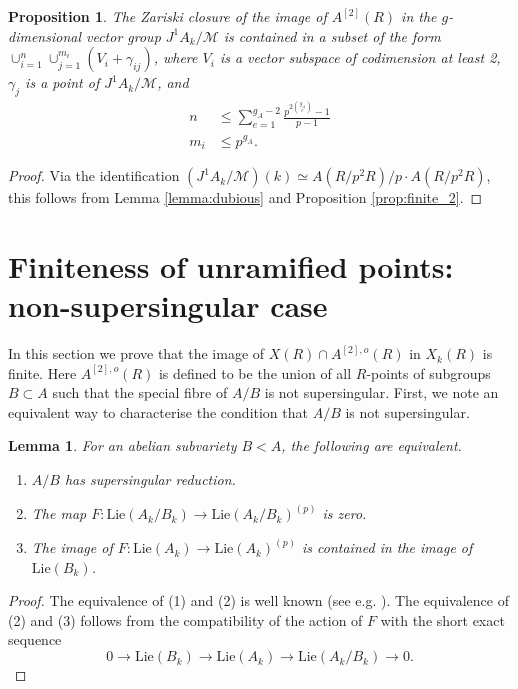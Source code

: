 \documentclass[11pt]{amsart}
\newcommand{\Lie}{\mathrm{Lie}}
\theoremstyle{plain}
\newtheorem{lemma}{Lemma}
\newtheorem{proposition}{Proposition}
\theoremstyle{definition}
\begin{document}
\begin{proposition}\label{prop:zar}
The Zariski closure of the image of $A^{[2]}(R)$ in the $g$-dimensional vector group $J^1 A_k /\mathcal{M}$ is contained in a subset of the form $\cup _{i=1}^n \cup _{j=1}^{m_i} (V_i +\gamma _{ij} )$, where $V_i$ is a vector subspace of codimension at least 2, $\gamma _j$ is a point of $J^1 A_k /\mathcal{M}$, and 
\begin{align*}
n & \leq \sum _{e=1}^{g_A -2}\frac{p^{2\binom{g_A }{e}}-1}{p-1}\\
m_i & \leq p^{g_A} .
\end{align*}
\end{proposition}
\begin{proof}
Via the identification $(J^1 A_k /\mathcal{M})(k)\simeq A(R/p^2 R)/p\cdot A(R/p^2 R)$, this follows from Lemma \ref{lemma:dubious} and Proposition \ref{prop:finite_2}.
\end{proof}

\section{Finiteness of unramified points: non-supersingular case}\label{sec:2}
In this section we prove that the image of $X(R)\cap A^{[2],o}(R)$ in $X_k (R)$ is finite. Here $A^{[2],o}(R)$ is defined to be the union of all $R$-points of subgroups $B\subset A$ such that the special fibre of $A/B$ is not supersingular. First, we note an equivalent way to characterise the condition that $A/B$ is not supersingular.
\begin{lemma}\label{lemma:equivalent}
For an abelian subvariety $B<A$, the following are equivalent.
\begin{enumerate}
\item $A/B$ has supersingular reduction.
\item The map $F:\Lie (A_k /B_k )\to \Lie (A_k /B_k )^{(p)}$ is zero.
\item The image of $F:\Lie (A_k )\to \Lie (A_k )^{(p)}$ is contained in the image of $\Lie (B_k )$.
\end{enumerate}
\end{lemma}
\begin{proof}
The equivalence of (1) and (2) is well known (see e.g. \cite{coleman:ramified}). The equivalence of (2) and (3) follows from the compatibility of the action of $F$ with the short exact sequence
\[
0\to \Lie (B_k )\to \Lie (A_k )\to \Lie (A_k /B_k )\to 0.
\]
\end{proof}
\end{document}
